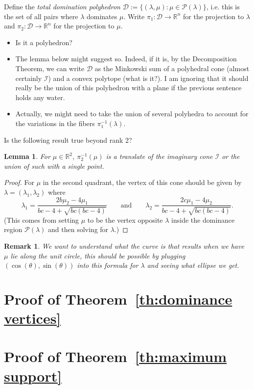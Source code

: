 \documentclass{amsart}
\newtheorem{lemma}[theorem]{Lemma}
\newtheorem{remark}[theorem]{Remark}
\numberwithin{theorem}{section}
\newcommand{\cD}{\mathcal{D}}
\newcommand{\cI}{\mathcal{I}}
\newcommand{\cP}{\mathcal{P}}
\newcommand{\RR}{\mathbb{R}}
\begin{document}
  Define the \emph{total domination polyhedron} $\cD:=\{(\lambda,\mu):\mu\in\cP(\lambda)\}$, i.e. this is the set of all pairs where $\lambda$ dominates $\mu$.
  Write $\pi_1:\cD\to\RR^n$ for the projection to $\lambda$ and $\pi_2:\cD\to\RR^n$ for the projection to $\mu$.
  \begin{itemize}
    \item Is it a polyhedron?
    \item The lemma below might suggest so.  
      Indeed, if it is, by the Decomposition Theorem, we can write $\cD$ as the Minkowski sum of a polyhedral cone (almost certainly $\cI$) and a convex polytope (what is it?).
      I am ignoring that it should really be the union of this polyhedron with a plane if the previous sentence holds any water.
    \item Actually, we might need to take the union of several polyhedra to account for the variations in the fibers $\pi_1^{-1}(\lambda)$.
  \end{itemize}

  Is the following result true beyond rank 2?
  \begin{lemma}
    For $\mu\in\RR^2$, $\pi_2^{-1}(\mu)$ is a translate of the imaginary cone $\cI$ or the union of such with a single point.
  \end{lemma}
  \begin{proof}
    For $\mu$ in the second quadrant, the vertex of this cone should be given by $\lambda=(\lambda_1,\lambda_2)$ where
    \[\lambda_1=\frac{2b\mu_2-4\mu_1}{bc-4+\sqrt{bc(bc-4)}} \qquad \text{and} \qquad \lambda_2=\frac{2c\mu_1-4\mu_2}{bc-4+\sqrt{bc(bc-4)}}.\]
    (This comes from setting $\mu$ to be the vertex opposite $\lambda$ inside the dominance region $\cP(\lambda)$ and then solving for $\lambda$.)
  \end{proof}
  \begin{remark}
    We want to understand what the curve is that results when we have $\mu$ lie along the unit circle, this should be possible by plugging $(\cos(\theta),\sin(\theta))$ into this formula for $\lambda$ and seeing what ellipse we get.
  \end{remark}


\section{Proof of Theorem~\ref{th:dominance vertices}}


\section{Proof of Theorem~\ref{th:maximum support}}
\end{document}
